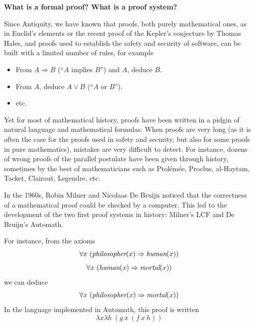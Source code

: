 \begin{shaded}
  \vspace*{-0.5cm}
  \begin{center}
    {\bf \Large What is a formal proof? What is a proof system?}
    \end{center}

Since Antiquity, we have known that
proofs, both purely mathematical ones, as in Euclid's elements or the
recent proof of the Kepler's conjecture by Thomas Hales, and proofs used
to establish the safety and security of software, can be built with a
limited number of rules, for example
\begin{itemize}
\item From $A\Rightarrow B$ (``$A$ implies $B$'') and $A$, deduce $B$.
\item From $A$, deduce $A\vee B$ (``$A$ or $B$'').
\item etc.
\end{itemize}
Yet for most of mathematical history, proofs have been written in
a pidgin of natural language and mathematical formulas. When proofs are
very long (as it is often the case for the proofs used in safety and security,
but also for some proofs in pure mathematics), mistakes are
very difficult to detect. For instance, dozens of wrong proofs of
the parallel postulate have been given through history, sometimes by the
best of mathematicians such as Ptolémée, Proclus, al-Haytam, Tacket,
Clairaut, Legendre, etc.

In the 1960s, Robin Milner and Nicolaas De Bruijn noticed that the
correctness of a mathematical proof could be checked by a
computer. This led to the development of the two first proof systems
in history: Milner's LCF and De Bruijn's Automath.

For instance, from the axioms
$$\forall x~(\mbox{\em philosopher}(x) \Rightarrow \mbox{\em human}(x))$$
$$\forall x~(\mbox{\em human}(x) \Rightarrow \mbox{\em mortal}(x))$$
we can deduce
$$\forall x~(\mbox{\em philosopher}(x) \Rightarrow \mbox{\em mortal}(x))$$
In the language implemented in Automath, this proof is written
$$\lambda x \lambda h~(g~x~(f~x~h))$$
\end{shaded}

